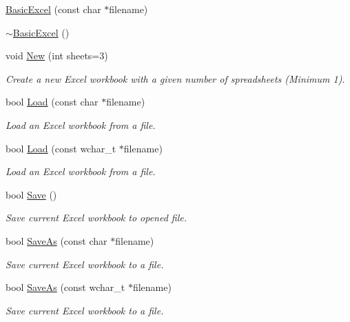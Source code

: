 \begin{DoxyCompactItemize}
\item 
\hyperlink{class_y_excel_1_1_basic_excel_ade0a7e1f99dc56cea809c7db31b34f05}{Basic\+Excel} (const char $\ast$filename)
\item 
\hyperlink{class_y_excel_1_1_basic_excel_a5f0fba85f6f0d10706430f0f00f93945}{$\sim$\+Basic\+Excel} ()
\item 
void \hyperlink{class_y_excel_1_1_basic_excel_a61cbf0e9d5bca97c10df212f8219b6f1}{New} (int sheets=3)
\begin{DoxyCompactList}\small\item\em Create a new Excel workbook with a given number of spreadsheets (Minimum 1). \end{DoxyCompactList}\item 
bool \hyperlink{class_y_excel_1_1_basic_excel_a7dc1a3b9d95654129f0ada8eb0d6ea28}{Load} (const char $\ast$filename)
\begin{DoxyCompactList}\small\item\em Load an Excel workbook from a file. \end{DoxyCompactList}\item 
bool \hyperlink{class_y_excel_1_1_basic_excel_a66b588c8f1d1aae6a6a03d57d5a15cf5}{Load} (const wchar\+\_\+t $\ast$filename)
\begin{DoxyCompactList}\small\item\em Load an Excel workbook from a file. \end{DoxyCompactList}\item 
bool \hyperlink{class_y_excel_1_1_basic_excel_acae9790120b1827808184d1bd7870765}{Save} ()
\begin{DoxyCompactList}\small\item\em Save current Excel workbook to opened file. \end{DoxyCompactList}\item 
bool \hyperlink{class_y_excel_1_1_basic_excel_aa74ad2c41158d036622cfd96c2adf586}{Save\+As} (const char $\ast$filename)
\begin{DoxyCompactList}\small\item\em Save current Excel workbook to a file. \end{DoxyCompactList}\item 
bool \hyperlink{class_y_excel_1_1_basic_excel_a5b6097ce4c4a07bf3f0cc9281d7b6ad2}{Save\+As} (const wchar\+\_\+t $\ast$filename)
\begin{DoxyCompactList}\small\item\em Save current Excel workbook to a file. \end{DoxyCompactList}\item 

\end{DoxyCompactItemize}
